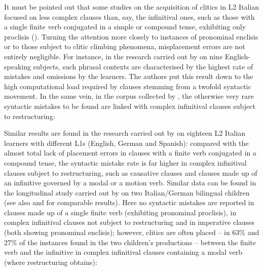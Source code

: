 \documentclass[output=paper,modfonts,nonflat,newtxmath]{langsci/langscibook}
\begin{document}
It must be pointed out that some studies on the acquisition of clitics in L2 Italian focused on less complex clauses than, say, the infinitival ones, such as those with a single finite verb conjugated in a simple or compound tense, exhibiting only proclisis (\citealt{LeoniniBelletti2004, Leonini2006}). Turning the attention more closely to instances of pronominal enclisis or to those subject to clitic climbing phenomena, misplacement errors are not entirely negligible. For instance, in the research carried out by \citet{GianniniCancila2006} on nine English-speaking subjects, such phrasal contexts are characterised by the highest rate of mistakes and omissions by the learners. The authors put this result down to the high computational load required by clauses stemming from a twofold syntactic movement. In the same vein, in the corpus collected by \citet{Berretta1986}, the otherwise very rare syntactic mistakes to be found are linked with complex infinitival clauses subject to restructuring:

\z


Similar results are found in the research carried out by \citet{BennatiMatteini2006} on eighteen L2 Italian learners with different L1s (English, German and Spanish): compared with the almost total lack of placement errors in clauses with a finite verb conjugated in a compound tense, the syntactic mistake rate is far higher in complex infinitival clauses subject to restructuring, such as causative clauses and clauses made up of an infinitive governed by a modal or a motion verb. Similar data can be found in the longitudinal study carried out by \citet{Ferrari2006} on two Italian/German bilingual children (see also \citealt{BernardiniTimofte2017} and \citealt{BernardiniWeijer2017} for comparable results). Here no syntactic mistakes are reported in clauses made up of a single finite verb (exhibiting pronominal proclisis), in complex infinitival clauses not subject to restructuring and in imperative clauses (both showing pronominal enclisis); however, clitics are often placed – in 63\% and 27\% of the instances found in the two children’s productions – between the finite verb and the infinitive in complex infinitival clauses containing a modal verb (where restructuring obtains):
\end{document}

